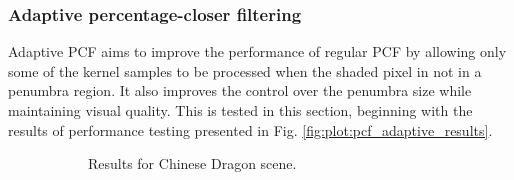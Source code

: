 \subsubsection{Adaptive percentage-closer filtering}
Adaptive PCF aims to improve the performance of regular PCF by allowing only some of the kernel samples to be processed when the shaded pixel in not in a penumbra region. It also improves the control over the penumbra size while maintaining visual quality. This is tested in this section, beginning with the results of performance testing presented in Fig. \ref{fig:plot:pcf_adaptive_results}.

\begin{figure}[h]
    \centering
    \begin{subfigure}[t]{0.48\textwidth}
        \caption{Results for Chinese Dragon scene.}
        \label{fig:plot:pcf_adaptive_dragon}
    \end{subfigure}
    \hfill
    \begin{subfigure}[t]{0.48\textwidth}

\end{subfigure}
\end{figure}
